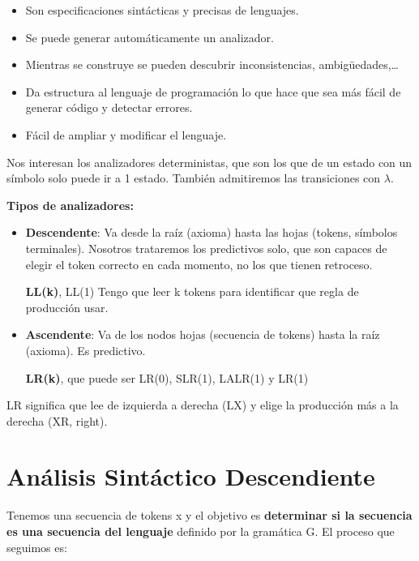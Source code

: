 \documentclass[12pt, twoside, openright]{report} %
\begin{document}
\begin{itemize}

\item
  Son especificaciones sintácticas y precisas de lenguajes.
\item
  Se puede generar automáticamente un analizador.
\item
  Mientras se construye se pueden descubrir inconsistencias,
  ambigüedades,\ldots{}
\item
  Da estructura al lenguaje de programación lo que hace que sea más
  fácil de generar código y detectar errores.
\item
  Fácil de ampliar y modificar el lenguaje.
\end{itemize}

Nos interesan los analizadores deterministas, que son los que de un
estado con un símbolo solo puede ir a 1 estado. También admitiremos las
transiciones con \(\lambda\).

\textbf{Tipos de analizadores:}

\begin{itemize}
\item \textbf{Descendente}: Va desde la raíz (axioma) hasta las hojas
  (tokens, símbolos terminales). Nosotros trataremos los predictivos
  solo, que son capaces de elegir el token correcto en cada momento, no
  los que tienen retroceso.

  \textbf{LL(k)}, LL(1) Tengo que leer k tokens para identificar que
  regla de producción usar.
\item \textbf{Ascendente}: Va de los nodos hojas (secuencia de tokens) hasta
  la raíz (axioma). Es predictivo.

  \textbf{LR(k)}, que puede ser LR(0), SLR(1), LALR(1) y LR(1)
\end{itemize}

LR significa que lee de izquierda a derecha (LX) y elige la producción
más a la derecha (XR, right).

\section{Análisis Sintáctico Descendiente}

Tenemos una secuencia de tokens x y el objetivo es \textbf{determinar si
la secuencia es una secuencia del lenguaje} definido por la gramática G.
El proceso que seguimos es:
\end{document}
